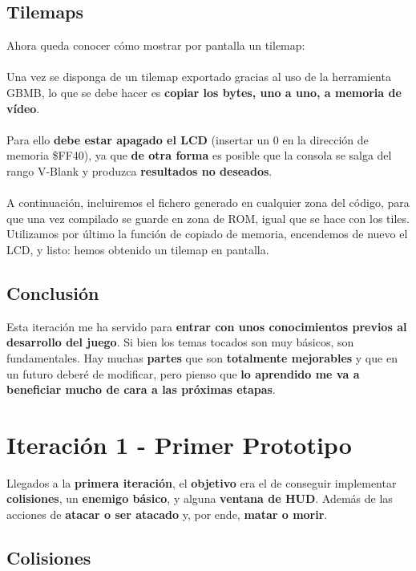 \subsection{Tilemaps}

Ahora queda conocer cómo mostrar por pantalla un tilemap:
\\ \\
Una vez se disponga de un tilemap exportado gracias al uso de la herramienta GBMB, lo que se debe hacer es \textbf{copiar los bytes, uno a uno, a memoria de vídeo}.
\\ \\
Para ello \textbf{debe estar apagado el LCD} (insertar un 0 en la dirección de memoria \$FF40), ya que \textbf{de otra forma} es posible que la consola se salga del rango V-Blank y produzca \textbf{resultados no deseados}.
\\ \\
A continuación, incluiremos el fichero generado en cualquier zona del código, para que una vez compilado se guarde en zona de ROM, igual que se hace con los tiles. Utilizamos por último la función de copiado de memoria, encendemos de nuevo el LCD, y listo: hemos obtenido un tilemap en pantalla.

\subsection{Conclusión}

Esta iteración me ha servido para \textbf{entrar con unos conocimientos previos al desarrollo del juego}. Si bien los temas tocados son muy básicos, son fundamentales. Hay muchas \textbf{partes} que son \textbf{totalmente mejorables} y que en un futuro deberé de modificar, pero pienso que \textbf{lo aprendido me va a beneficiar mucho de cara a las próximas etapas}.

\clearpage

\section{Iteración 1 - Primer Prototipo}

Llegados a la \textbf{primera iteración}, el \textbf{objetivo} era el de conseguir implementar \textbf{colisiones}, un \textbf{enemigo básico}, y alguna \textbf{ventana de HUD}. Además de las acciones de \textbf{atacar o ser atacado} y, por ende, \textbf{matar o morir}.

\subsection{Colisiones}

